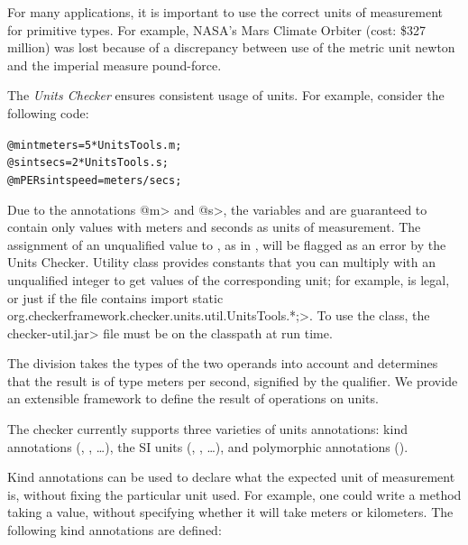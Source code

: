 
For many applications, it is important to use the correct units of
measurement for primitive types.  For example, NASA's Mars Climate Orbiter
(cost: \$327 million) was lost because of a discrepancy between use
of the metric unit newton and the imperial measure pound-force.

The \emph{Units Checker} ensures consistent usage of units.
For example, consider the following code:

\begin{alltt}
@m int meters = 5 * UnitsTools.m;
@s int secs = 2 * UnitsTools.s;
@mPERs int speed = meters / secs;
\end{alltt}

Due to the annotations \<@m> and \<@s>, the variables  and  are guaranteed to contain
only values with meters and seconds as units of measurement.
The assignment of an unqualified value to , as in
, will be flagged as an error by the Units Checker.
Utility class  provides constants
that you can multiply with an unqualified integer to get values
of the corresponding unit; for example,  is legal, or just  if the file contains
\<import static org.checkerframework.checker.units.util.UnitsTools.*;>.
To use the  class, the
\<checker-util.jar> file must be on the classpath at run time.

The division  takes the types of the two operands
into account and determines that the result is of type
meters per second, signified by the  qualifier.
We provide an extensible framework to define the result of operations
on units.



The checker currently supports three varieties of units annotations:
kind annotations (,
, \dots),
the SI units (, , \dots), and polymorphic annotations
().


Kind annotations can be used to declare what the expected unit of
measurement is, without fixing the particular unit used.
For example, one could write a method taking a  value,
without specifying whether it will take meters or kilometers.
The following kind annotations are defined:

